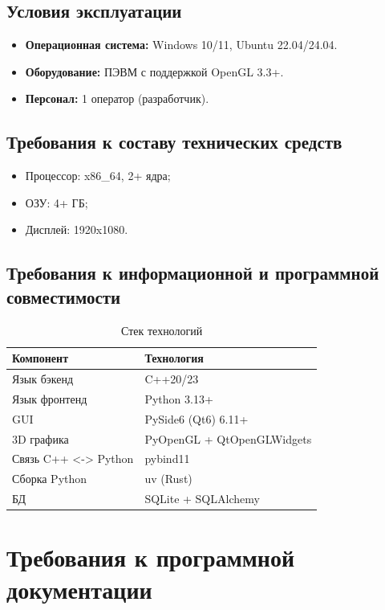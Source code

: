 \documentclass[a4paper,14pt]{extarticle}
\begin{document}
\subsection{Условия эксплуатации}
\begin{itemize}
    \item \textbf{Операционная система:} Windows 10/11, Ubuntu 22.04/24.04.
    \item \textbf{Оборудование:} ПЭВМ с поддержкой OpenGL 3.3+.
    \item \textbf{Персонал:} 1 оператор (разработчик).
\end{itemize}

\subsection{Требования к составу технических средств}
\begin{itemize}
    \item Процессор: x86\_64, 2+ ядра;
    \item ОЗУ: 4+ ГБ;
    \item Дисплей: 1920x1080.
\end{itemize}

\subsection{Требования к информационной и программной совместимости}

\begin{table}[H]
\centering
\begin{tabular}{|p{5cm}|p{8cm}|}
\hline
\textbf{Компонент} & \textbf{Технология} \\
\hline
Язык бэкенд & C++20/23 \\
\hline
Язык фронтенд & Python 3.13+ \\
\hline
GUI & PySide6 (Qt6) 6.11+ \\
\hline
3D графика & PyOpenGL + QtOpenGLWidgets \\
\hline
Связь C++ <-> Python & pybind11 \\
\hline
Сборка Python & uv (Rust) \\
\hline
БД & SQLite + SQLAlchemy \\
\hline
\end{tabular}
\caption{Стек технологий}
\end{table}

\section{Требования к программной документации}
\end{document}
